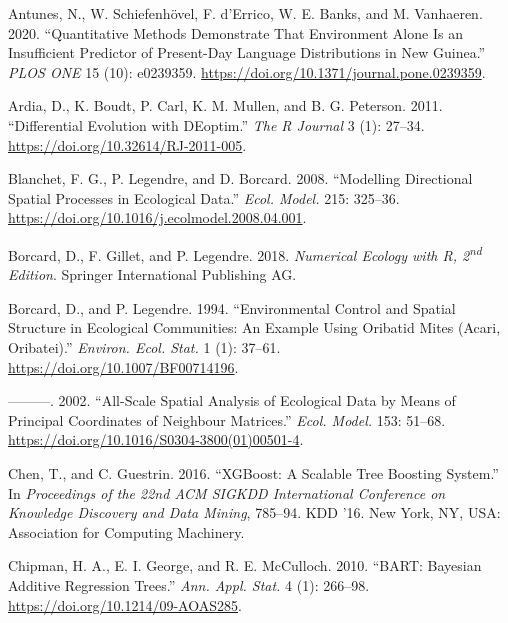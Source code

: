 \documentclass[
]{article}
\newlength{\cslhangindent}
\newenvironment{CSLReferences}[2] %
 {\begin{list}{}{%
  \setlength{\itemindent}{0pt}
  \setlength{\leftmargin}{0pt}
  \setlength{\parsep}{0pt}
  \ifodd #1
   \setlength{\leftmargin}{\cslhangindent}
   \setlength{\itemindent}{-1\cslhangindent}
  \fi
  \setlength{\itemsep}{#2\baselineskip}}}
 {\end{list}}
\begin{document}
\label{refs}
\begin{CSLReferences}{1}{0}
Antunes, N., W. Schiefenhövel, F. d'Errico, W. E. Banks, and M.
Vanhaeren. 2020. {``Quantitative Methods Demonstrate That Environment
Alone Is an Insufficient Predictor of Present-Day Language Distributions
in {New} {Guinea}.''} \emph{PLOS ONE} 15 (10): e0239359.
\url{https://doi.org/10.1371/journal.pone.0239359}.

Ardia, D., K. Boudt, P. Carl, K. M. Mullen, and B. G. Peterson. 2011.
{``Differential Evolution with {DEoptim}.''} \emph{{The R Journal}} 3
(1): 27--34. \url{https://doi.org/10.32614/RJ-2011-005}.

Blanchet, F. G., P. Legendre, and D. Borcard. 2008. {``Modelling
Directional Spatial Processes in Ecological Data.''} \emph{Ecol. Model.}
215: 325--36. \url{https://doi.org/10.1016/j.ecolmodel.2008.04.001}.

Borcard, D., F. Gillet, and P. Legendre. 2018. \emph{Numerical Ecology
with {R}, 2\textsuperscript{nd} Edition}. Springer International
Publishing AG.

Borcard, D., and P. Legendre. 1994. {``Environmental Control and Spatial
Structure in Ecological Communities: {A}n Example Using {O}ribatid Mites
({A}cari, {O}ribatei).''} \emph{Environ. Ecol. Stat.} 1 (1): 37--61.
\url{https://doi.org/10.1007/BF00714196}.

---------. 2002. {``All-Scale Spatial Analysis of Ecological Data by
Means of Principal Coordinates of Neighbour Matrices.''} \emph{Ecol.
Model.} 153: 51--68.
\url{https://doi.org/10.1016/S0304-3800(01)00501-4}.

Chen, T., and C. Guestrin. 2016. {``{XGBoost}: A Scalable Tree Boosting
System.''} In \emph{Proceedings of the 22nd {ACM} {SIGKDD} International
Conference on Knowledge Discovery and Data Mining}, 785--94. {KDD} '16.
New York, NY, USA: Association for Computing Machinery.

Chipman, H. A., E. I. George, and R. E. McCulloch. 2010. {``{BART}:
{Bayesian} Additive Regression Trees.''} \emph{Ann. Appl. Stat.} 4 (1):
266--98. \url{https://doi.org/10.1214/09-AOAS285}.


\end{CSLReferences}
\end{document}
